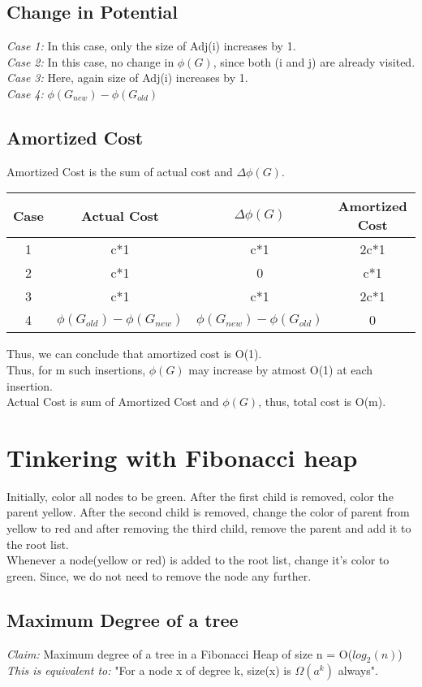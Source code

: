 \documentclass{article}
\begin{document}
\subsection{ Change in Potential}


\emph{Case 1: } In this case, only the size of Adj(i) increases by 1.\\
\emph{Case 2: } In this case, no change in $\phi(G)$, since both (i and j) are already visited.\\
\emph{Case 3: } Here, again size of Adj(i) increases by 1.\\
\emph{Case 4: } $\phi(G_{new}) - \phi(G_{old})$


\subsection{Amortized Cost}

Amortized Cost is the sum of actual cost and $\Delta \phi(G)$. \\


\begin{center}
\begin{tabular}{|c|c|c|c|}
\hline
Case & Actual Cost & $\Delta \phi(G) $ & Amortized Cost \\
\hline
1 & c*1 & c*1 &  2c*1 \\
\hline
2 & c*1 & 0 & c*1 \\
\hline
3 & c*1 & c*1 & 2c*1 \\
\hline
4 & $\phi(G_{old}) - \phi(G_{new})$ & $\phi(G_{new}) - \phi(G_{old})$ & 0 \\
\hline
\end{tabular}
\end{center}
Thus, we can conclude that amortized cost is O(1).\\
Thus, for m such insertions, $\phi(G)$ may increase by atmost O(1) at each insertion.\\
Actual Cost is sum of Amortized Cost and $\phi(G)$, thus, total cost is O(m).

\section{Tinkering with Fibonacci heap}

Initially, color all nodes to be green. After the first child is removed, color the parent yellow. After the second child is removed, change the color of parent from yellow to red and after removing the third child, remove the parent and add it to the root list. \\
Whenever a node(yellow or red) is added to the root list, change it's color to green. Since, we do not need to remove the node any further. 

\subsection{Maximum Degree of a tree}

\emph{Claim: }Maximum degree of a tree in a Fibonacci Heap of size n = O($log_2(n)$) \\
\emph{This is equivalent to: } "For a node x of degree k, size(x) is $\Omega (a^k)$ always".
\end{document}
